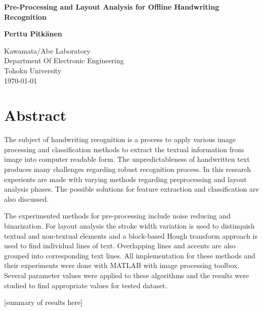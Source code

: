 \documentclass{article}
\begin{document}
   \begin{titlepage}
     \begin{center}
       \vspace*{1cm}

        \huge
        \textbf{Pre-Processing and Layout Analysis for Offline Handwriting Recognition}

        \vspace{2cm}

        \textbf{Perttu Pitk{\"a}nen}

        \vfill
        \Large
        Kawamata/Abe Laboratory\\
        Department Of Electronic Engineering\\
        Tohoku University\\
        \today
     \end{center}
   \end{titlepage}

   \newpage
   \section*{Abstract}
    The subject of handwriting recognition is a process to apply various image processing and classification methods to extract the textual information from image into computer readable form. The unpredictableness of handwritten text produces many challenges regarding robust recognition process. In this research experients are made with varying methods regarding preprocessing and layout analysis phases. The possible solutions for feature extraction and classification are also discussed.

    The experimented methods for pre-processing include noise reducing and binarization. For layout analysis the stroke width variation is used to distinquish textual and non-textual elements and a block-based Hough transform approach is used to find individual lines of text. Overlapping lines and accents are also grouped into corresponding text lines. All implementation for these methods and their experiments were done with MATLAB with image processing toolbox. Several parameter values were applied to these algorithms and the results were studied to find appropriate values for tested dataset.

    {\color{red}[summary of results here]}

   \newpage
   \tableofcontents
\end{document}
